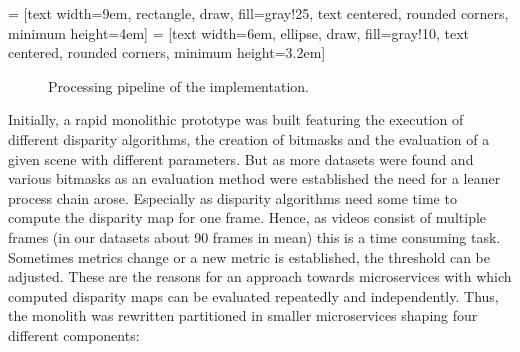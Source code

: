  = [text width=9em, rectangle, draw, fill=gray!25, text centered, rounded corners, minimum height=4em]
 = [text width=6em, ellipse, draw, fill=gray!10, text centered, rounded corners, minimum height=3.2em]
\begin{figure}[h!]
  \centering
  \caption{Processing pipeline of the implementation.}
  \label{fig:impl-pipeline}
\end{figure}

Initially, a rapid monolithic prototype was built featuring the execution of different disparity algorithms, the creation of bitmasks and the evaluation of a given scene with different parameters.
But as more datasets were found and various bitmasks as an evaluation method were established the need for a leaner process chain arose.
Especially as disparity algorithms need some time to compute the disparity map for one frame.
Hence, as videos consist of multiple frames (in our datasets about 90 frames in mean) this is a time consuming task.
Sometimes metrics change or a new metric is established, the threshold can be adjusted.
These are the reasons for an approach towards microservices with which computed disparity maps can be evaluated repeatedly and independently.
Thus, the monolith was rewritten partitioned in smaller microservices shaping four different components:


